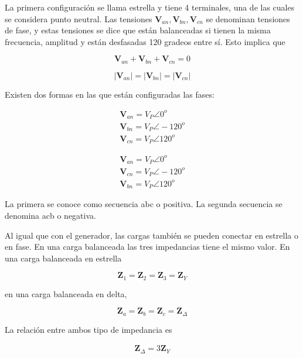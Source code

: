 La primera configuración se llama estrella y tiene 4 terminales, una de las cuales se considera punto neutral. Las tensiones $\mathbf{V}_{an},\mathbf{V}_{bn},\mathbf{V}_{cn}$ se denominan tensiones de fase, y estas tensiones se dice que están balanceadas si tienen la misma frecuencia, amplitud y están desfasadas 120 gradeos entre sí. Esto implica que

\begin{equation*}
\mathbf{V}_{an} + \mathbf{V}_{bn} + \mathbf{V}_{cn} = 0
\end{equation*}

\begin{equation*}
|\mathbf{V}_{an}|=|\mathbf{V}_{bn}|=|\mathbf{V}_{cn}|
\end{equation*}

Existen dos formas en las que están configuradas las fases:

\begin{eqnarray*}
\mathbf{V}_{an} = V_P \angle 0^{o}  \\
\mathbf{V}_{bn} = V_P \angle -120^{o} \\
\mathbf{V}_{cn} = V_P \angle 120^{o}
\end{eqnarray*}

\begin{eqnarray*}
\mathbf{V}_{an} = V_P \angle 0^{o} \\
\mathbf{V}_{cn} = V_P \angle  -120^{o} \\
\mathbf{V}_{bn} = V_P \angle  120^{o}
\end{eqnarray*}

La primera se conoce como secuencia abc o positiva. La segunda secuencia se denomina acb o negativa.


Al igual que con el generador, las cargas también se pueden conectar en estrella o en fase. En una carga balanceada las tres impedancias tiene el mismo valor. En una carga balanceada en estrella

\begin{equation*}
\mathbf{Z}_1 = \mathbf{Z}_2 = \mathbf{Z}_3 = \mathbf{Z}_Y
\end{equation*}

en una carga balanceada en delta,

\begin{equation*}
\mathbf{Z}_a = \mathbf{Z}_b = \mathbf{Z}_c = \mathbf{Z}_{\Delta}
\end{equation*}

La relación entre ambos tipo de impedancia es

\begin{eqnarray*}
\mathbf{Z}_{\Delta} = 3 \mathbf{Z}_Y
\end{eqnarray*}

